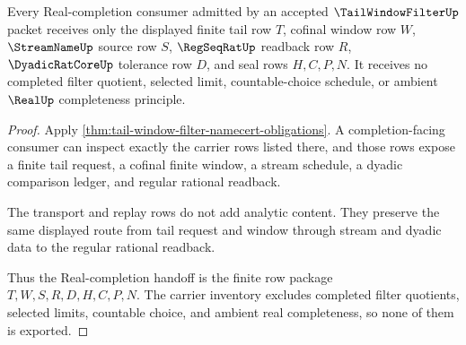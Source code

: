 \begin{theorem}
\label{thm:tail-window-filter-real-completion-handoff}
Every Real-completion consumer admitted by an accepted $\TailWindowFilterUp$ packet receives only the displayed finite tail row $T$, cofinal window row $W$, $\StreamNameUp$ source row $S$, $\RegSeqRatUp$ readback row $R$, $\DyadicRatCoreUp$ tolerance row $D$, and seal rows $H,C,P,N$. It receives no completed filter quotient, selected limit, countable-choice schedule, or ambient $\RealUp$ completeness principle.
\end{theorem}
\begin{proof}
Apply \autoref{thm:tail-window-filter-namecert-obligations}. A completion-facing consumer can inspect exactly the carrier rows listed there, and those rows expose a finite tail request, a cofinal finite window, a stream schedule, a dyadic comparison ledger, and regular rational readback.

The transport and replay rows do not add analytic content. They preserve the same displayed route from tail request and window through stream and dyadic data to the regular rational readback.

Thus the Real-completion handoff is the finite row package $T,W,S,R,D,H,C,P,N$. The carrier inventory excludes completed filter quotients, selected limits, countable choice, and ambient real completeness, so none of them is exported.
\end{proof}


\begin{closurestatus}{\TailWindowFilterUp}
  \theoryclosure{\seedClosure}
  \formalstatus{\unformalizedV}
\end{closurestatus}
